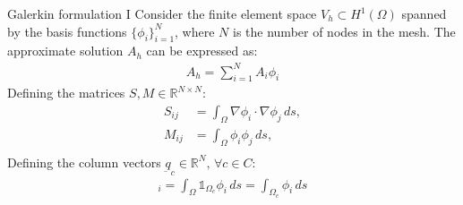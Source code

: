 \documentclass[aspectratio=54,xcolor=dvipsnames]{beamer}
\begin{document}
\begin{frame}{Galerkin formulation I}
    Consider the finite element space $V_h \subset H^1(\Omega)$ spanned by the basis functions $\{\phi_i\}_{i=1}^{N}$, where $N$ is the number of nodes in the mesh. The approximate solution $A_h$ can be expressed as:
    \begin{align*}
        A_h = \sum_{i=1}^{N} A_i \phi_i
    \end{align*}
    Defining the matrices $S, M \in \mathbb{R}^{N \times N}$:
    \begin{align*}
        S_{ij} &= \int_{\Omega} \nabla \phi_i \cdot \nabla \phi_j \, ds, \\
        M_{ij} &= \int_{\Omega} \phi_i \phi_j \, ds, \\
    \end{align*}
    Defining the column vectors $\underbar{q}_c \in \mathbb{R}^N, \, \forall c \in C $:
    \begin{align*}
        [\underbar{q}_c]_i = \int_{\Omega} \mathds{1}_{\Omega_c} \phi_i \, ds = \int_{\Omega_c} \phi_i \, ds
    \end{align*}

\end{frame}
\end{document}
